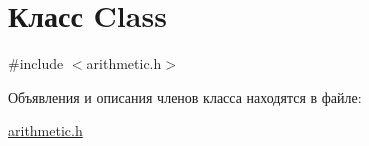 \hypertarget{class_class}{}\section{Класс Class}
\label{class_class}


{\ttfamily \#include $<$arithmetic.\+h$>$}



Объявления и описания членов класса находятся в файле\+:\begin{DoxyCompactItemize}
\item 
\hyperlink{arithmetic_8h}{arithmetic.\+h}\end{DoxyCompactItemize}
